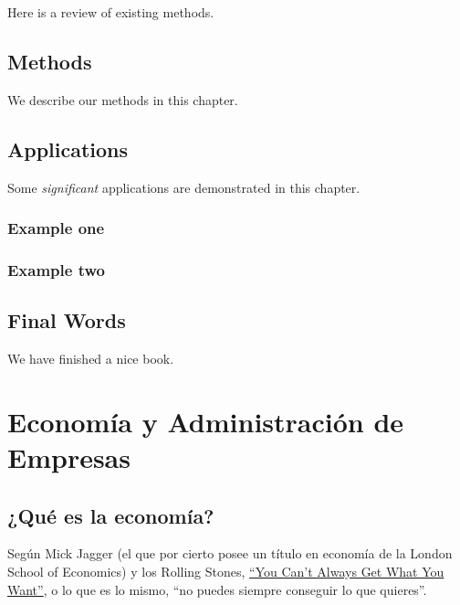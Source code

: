\documentclass[
]{book}
\begin{document}
Here is a review of existing methods.

\hypertarget{methods}{%
\chapter{Methods}\label{methods}}

We describe our methods in this chapter.

\hypertarget{applications}{%
\chapter{Applications}\label{applications}}

Some \emph{significant} applications are demonstrated in this chapter.

\hypertarget{example-one}{%
\section{Example one}\label{example-one}}

\hypertarget{example-two}{%
\section{Example two}\label{example-two}}

\hypertarget{final-words}{%
\chapter{Final Words}\label{final-words}}

We have finished a nice book.

\hypertarget{part-economuxeda-y-administraciuxf3n-de-empresas}{%
\part{Economía y Administración de Empresas}\label{part-economuxeda-y-administraciuxf3n-de-empresas}}

\hypertarget{quuxe9-es-la-economuxeda}{%
\chapter{¿Qué es la economía?}\label{quuxe9-es-la-economuxeda}}

Según Mick Jagger (el que por cierto posee un título en economía de la London School of Economics) y los Rolling Stones, \href{https://www.youtube.com/watch?v=oqMl5CRoFdk}{``You Can't Always Get What You Want''}, o lo que es lo mismo, ``no puedes siempre conseguir lo que quieres''.
\end{document}
